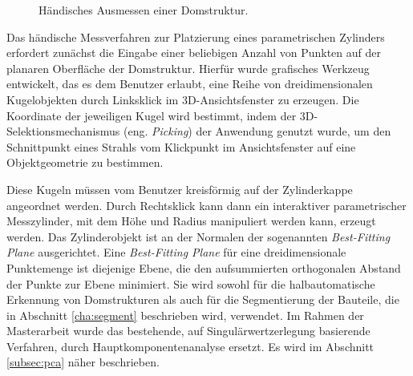 \begin{figure}[ht]
    \centering 
\caption{H\"andisches Ausmessen einer Domstruktur.} 
\label{im:domes}
\end{figure} 

Das h\"andische Messverfahren zur Platzierung eines parametrischen Zylinders erfordert zun\"achst die Eingabe einer beliebigen Anzahl von Punkten auf der planaren Oberfl\"ache der Domstruktur. Hierf\"ur wurde grafisches Werkzeug entwickelt, das es dem Benutzer erlaubt, eine Reihe von dreidimensionalen Kugelobjekten durch Linksklick im 3D-Ansichtsfenster zu erzeugen. Die Koordinate der jeweiligen Kugel wird bestimmt, indem der 3D-Selektionsmechanismus (eng. \textit{Picking}) der Anwendung genutzt wurde, um den Schnittpunkt eines Strahls vom Klickpunkt im Ansichtsfenster auf eine Objektgeometrie zu bestimmen.

Diese Kugeln m\"ussen vom Benutzer kreisf\"ormig auf der Zylinderkappe angeordnet werden. Durch Rechtsklick kann dann ein interaktiver parametrischer Messzylinder, mit dem H\"ohe und Radius manipuliert werden kann, erzeugt werden. Das Zylinderobjekt ist an der Normalen der sogenannten \textit{Best-Fitting Plane} ausgerichtet. Eine \textit{Best-Fitting Plane} f\"ur eine dreidimensionale Punktemenge ist diejenige Ebene, die den aufsummierten orthogonalen Abstand der Punkte zur Ebene minimiert. Sie wird sowohl f\"ur die halbautomatische Erkennung von Domstrukturen als auch f\"ur die Segmentierung der Bauteile, die in Abschnitt \ref{cha:segment} beschrieben wird, verwendet. Im Rahmen der Masterarbeit wurde das bestehende, auf Singulärwertzerlegung basierende Verfahren, durch Hauptkomponentenanalyse ersetzt. Es wird im Abschnitt \ref{subsec:pca} näher beschrieben.

